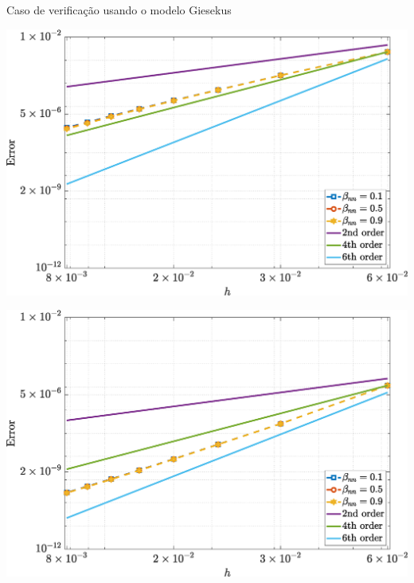 \begin{frame}{Caso de verificação usando o modelo Giesekus}
    \centering
    \captionsetup{justification=centering}
    \label{fig:giesekus_2}
    \begin{minipage}{0.49\textwidth}
        \centering
        \includegraphics[width=\textwidth]{Figures/NormErr_2nd_Re_100_Wi_1_epsilon_0_xi_0_alphaG_0.1_Dt_1e-06_at_0.05_tipsim_1_MMS_12_Wz.eps}
        \label{giesekus_wz_Case11}
    \end{minipage}
    \hfill
    \begin{minipage}{0.49\textwidth}
        \centering
        \includegraphics[width=\textwidth]{Figures/NormErr_2nd_Re_100_Wi_1_epsilon_0_xi_0_alphaG_0.1_Dt_1e-06_at_0.05_tipsim_1_MMS_12_Psi.eps}
        \label{giesekus_psi_Case11}
    \end{minipage}
\end{frame}

